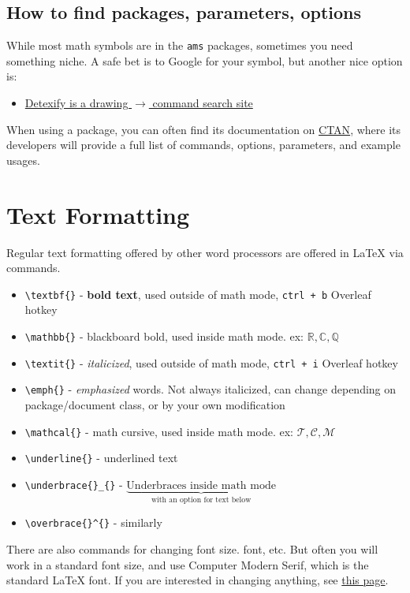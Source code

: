 \documentclass[twocolumn]{article}
\begin{document}
\subsection{How to find packages, parameters, options}
While most math symbols are in the \texttt{ams} packages, sometimes you need something niche. A safe bet is to Google for your symbol, but another nice option is:
\begin{itemize}
    \item \href{https://detexify.kirelabs.org/classify.html}{Detexify is a drawing $\to$ command search site}
\end{itemize}
When using a package, you can often find its documentation on \href{https://ctan.org}{CTAN}, where its developers will provide a full list of commands, options, parameters, and example usages.

\section{Text Formatting}
Regular text formatting offered by other word processors are offered in LaTeX via commands.\begin{itemize}
    \item \verb|\textbf{}| - \textbf{bold text}, used outside of math mode, \verb|ctrl + b| Overleaf hotkey
    \item \verb|\mathbb{}| - blackboard bold, used inside math mode. ex: $\mathbb{R,C,Q}$
    \item \verb|\textit{}| - \textit{italicized}, used outside of math mode, \verb|ctrl + i| Overleaf hotkey
    \item \verb|\emph{}| - \emph{emphasized} words. Not always italicized, can change depending on package/document class, or by your own modification
    \item \verb|\mathcal{}| - math cursive, used inside math mode. ex: $\mathcal{T, C,M}$
    \item \verb|\underline{}| - underlined text
    \item \verb|\underbrace{}_{}| - $\underbrace{\text{Underbraces inside math mode}}_{\text{with an option for text below}}$
    \item \verb|\overbrace{}^{}| - similarly
\end{itemize}
There are also commands for changing font size. font, etc. But often you will work in a standard font size, and use Computer Modern Serif, which is the standard LaTeX font. If you are interested in changing anything, see \href{https://www.overleaf.com/learn/latex/Font_sizes%2C_families%2C_and_styles}{this page}.
\end{document}
